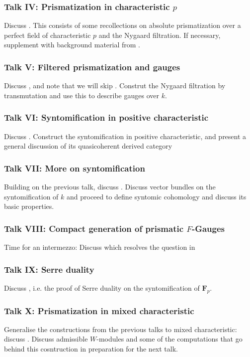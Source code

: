 \documentclass{article}
\begin{document}
\subsubsection*{Talk IV: Prismatization in characteristic $p$}
Discuss \cite[Section 3.1-3.2]{bhatt2022prismatic}. This consists of some recollections on absolute prismatization over a perfect field of characteristic $p$ and the Nygaard filtration. If necessary, supplement with background material from \cite{bhatt2022absolute}.
\subsubsection*{Talk V: Filtered prismatization and gauges}
Discuss \cite[Section 3.3-3.4]{bhatt2022prismatic}, and note that we will skip \cite[Section 3.5]{bhatt2022prismatic}. Construt the Nygaard filtration by transmutation and use this to describe gauges over $k$.
\subsubsection*{Talk VI: Syntomification in positive characteristic}
Discuss \cite[Section 4.1-4.2]{bhatt2022prismatic}. Construct the syntomification in positive characteristic, and present a general discussion of its quasicoherent derived category
\subsubsection*{Talk VII: More on syntomification}
Building on the previous talk, discuss \cite[Section 4.3-4.4]{bhatt2022prismatic}. Discuss vector bundles on the syntomification of $k$ and proceed to define syntomic cohomology and discuss its basic properties.
\subsubsection*{Talk VIII: Compact generation of prismatic $F$-Gauges}
Time for an intermezzo: Discuss \cite[Section 9.1]{carmeli2025prismatic} which resolves the question in \cite[Remark 4.4.6]{bhatt2022prismatic}
\subsubsection*{Talk IX: Serre duality}
Discuss \cite[Section 4.5]{bhatt2022prismatic}, i.e. the proof of Serre duality on the syntomification of $\mathbf{F}_p$.
\subsubsection*{Talk X: Prismatization in mixed characteristic}
Generalise the constructions from the previous talks to mixed characteristic: discuss \cite[Section 5.1-5.2]{bhatt2022prismatic}. Discuss admissible $W$-modules and some of the computations that go behind this cosntruction in preparation for the next talk.
\end{document}
